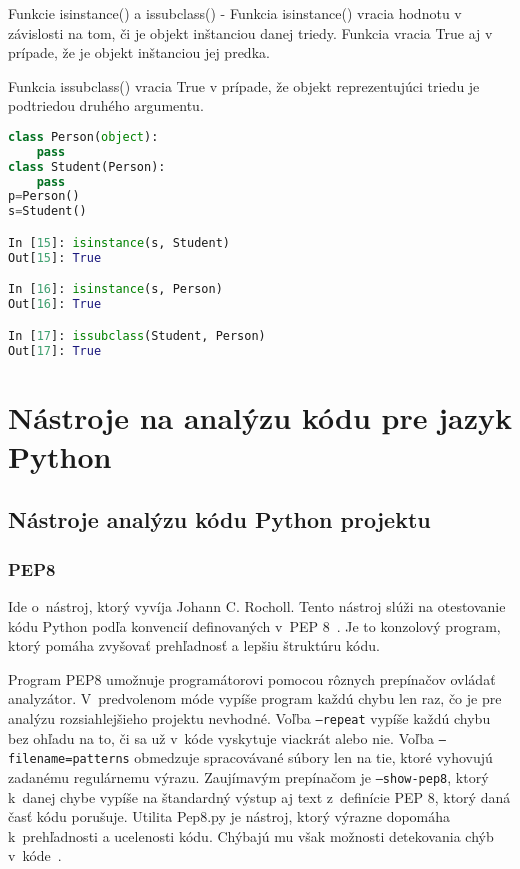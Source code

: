 \documentclass[11pt,oneside,final]{fithesis2}
\begin{document}
\begin{list}{•}{}
		\item Funkcie isinstance() a issubclass() - 
		Funkcia isinstance() vracia hodnotu v závislosti na tom, či je objekt inštanciou danej triedy. Funkcia vracia True aj v prípade, že je objekt inštanciou jej predka.
		
		Funkcia issubclass() vracia True v prípade, že objekt reprezentujúci triedu je podtriedou druhého argumentu.

\begin{lstlisting}[language=python]	
class Person(object):
    pass
class Student(Person):
    pass
p=Person()
s=Student()

In [15]: isinstance(s, Student)
Out[15]: True

In [16]: isinstance(s, Person)
Out[16]: True

In [17]: issubclass(Student, Person)
Out[17]: True
\end{lstlisting}		

\end{list}


\chapter{Nástroje na analýzu kódu pre jazyk Python}
	\section{Nástroje analýzu kódu Python projektu}	


\subsection{PEP8}
	Ide o~nástroj, ktorý vyvíja Johann C. Rocholl. Tento nástroj slúži na otestovanie kódu Python podľa konvencií definovaných v~PEP 8~\cite{pep8}. Je to konzolový program, ktorý pomáha zvyšovať prehľadnosť a lepšiu štruktúru kódu. 
	
	Program PEP8 umožnuje programátorovi pomocou rôznych prepínačov ovládať analyzátor. V~predvolenom móde vypíše program každú chybu len raz, čo je pre analýzu rozsiahlejšieho projektu nevhodné. Voľba \texttt{–repeat} vypíše každú chybu bez ohľadu na to, či sa už v~kóde vyskytuje viackrát alebo nie. Voľba \texttt{–filename=patterns} obmedzuje spracovávané súbory len na tie, ktoré vyhovujú zadanému regulárnemu výrazu. Zaujímavým prepínačom je \texttt{–show-pep8}, ktorý k~danej chybe vypíše na štandardný výstup aj text z~definície PEP 8, ktorý daná časť kódu porušuje.
    Utilita Pep8.py je nástroj, ktorý výrazne dopomáha k~prehľadnosti a ucelenosti kódu. Chýbajú mu však možnosti detekovania chýb v~kóde~\cite{pep8}.
\end{document}
